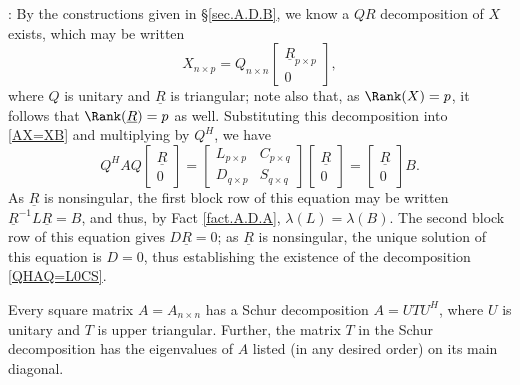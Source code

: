 \/: By the constructions given in \S \ref{sec.A.D.B}, we
know a $QR$ decomposition of $X$ exists, which may be written
\begin{equation*} X_{n\times p}=Q_{n\times n}\begin{bmatrix} \underline{R}_{p\times p} \\ 0 \end{bmatrix},
\end{equation*}
where $Q$ is unitary and $\underline{R}$ is triangular; note also
that, as $\Rank(X)=p$, it follows that $\Rank(\underline{R})=p$ as
well.  Substituting this decomposition into \eqref{AX=XB} and
multiplying by $Q^{H}$, we have
\begin{equation*}
Q^{H} A Q \begin{bmatrix} \underline{R} \\ 0 \end{bmatrix}
=\begin{bmatrix} L_{p\times p} & C_{p\times q} \\ D_{q\times p} & S_{q \times q} \end{bmatrix} \begin{bmatrix} \underline{R} \\ 0 \end{bmatrix}
=\begin{bmatrix} \underline{R} \\ 0 \end{bmatrix} B.
\end{equation*}
As $\underline{R}$ is nonsingular, the first block row of this
equation may be written $\underline{R}^{-1}L\underline{R}=B$, and
thus, by Fact \ref{fact.A.D.A}, $\lambda(L)=\lambda(B)$.  The second
block row of this equation gives $D \underline{R}=0$; as
$\underline{R}$ is nonsingular, the unique solution of this equation
is $D=0$, thus establishing the existence of the decomposition
\eqref{QHAQ=L0CS}.   \endproof

\begin{fact} \label{fact.A.D.C.Bb} Every square
matrix $A=A_{n\times n}$ has a Schur decomposition $A=U T U^{H}$,
where $U$ is unitary and $T$ is upper triangular.  Further, the matrix
$T$ in the Schur decomposition has the eigenvalues of $A$ listed (in
any desired order) on its main diagonal.
\end{fact}

